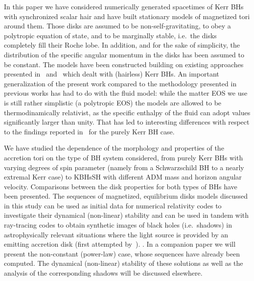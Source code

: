 \documentclass[twocolumn,aps,showpacs,showkeys,prd,superscriptaddress,byrevtex, amsmath]{revtex4-1}
\begin{document}
In this paper we have considered numerically generated spacetimes of Kerr BHs with synchronized scalar hair and have built stationary models of magnetized tori around them. Those disks are assumed to be non-self-gravitating, to obey a polytropic equation of state, and to be marginally stable, i.e.~the disks completely fill their Roche lobe. In addition, and for the sake of simplicity, the distribution of the specific angular momentum in the disks has been assumed to be constant. The models have been constructed building on existing approaches presented in~\cite{Komissarov:2006} and~\cite{Gimeno-Soler:2017} which dealt with (hairless) Kerr BHs. An important generalization of the present work compared to the methodology presented in previous works has had to do with the fluid model: while the matter EOS we use is still rather simplistic (a polytropic EOS) the models are allowed to be thermodinamically relativist, as the specific enthalpy of the fluid can adopt values significantly larger than unity. That has led to interesting differences with respect to the findings reported in~\cite{Gimeno-Soler:2017} for the purely Kerr BH case.

We have studied the dependence of the morphology and properties of the accretion tori on the type of BH system considered, from purely Kerr BHs with varying degrees of spin parameter (namely from a Schwarzschild BH to a nearly extremal Kerr case) to KBHsSH with different ADM mass and horizon angular velocity. Comparisons between the disk properties for both types of BHs have been presented. The sequences of magnetized, equilibrium disks models discussed in this study can be used as initial data for numerical relativity codes to investigate their dynamical (non-linear) stability and can be used in tandem with ray-tracing codes to obtain synthetic images of black holes (i.e.~shadows) in astrophysically relevant situations where the light source is provided by an emitting accretion disk (first attempted by~\cite{Vincent:2016}). . In a companion paper we will present the non-constant (power-law) case, whose sequences have already been computed. The dynamical (non-linear) stability of these solutions as well as the analysis of the corresponding shadows will be discussed elsewhere.
\end{document}
